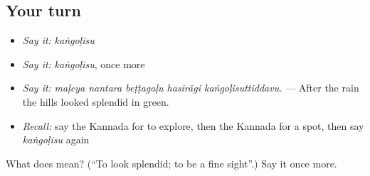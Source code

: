 \subsection*{Your turn}
\begin{itemize}
\raggedright
  \item \emph{Say it:} \emph{kaṅgoḷisu}
  \item \emph{Say it:} \emph{kaṅgoḷisu}, once more
  \item \emph{Say it:} \emph{maḷeya nantara beṭṭagaḷu hasirāgi kaṅgoḷisuttiddavu.} — After the rain the hills looked splendid in green.
  \item \emph{Recall:} say the Kannada for to explore, then the Kannada for a spot, then say \emph{kaṅgoḷisu} again
\end{itemize}

\begin{tcolorbox}[breakable,colback=teal!4,colframe=teal!35!black,title={Before you move on}]
What does  mean? (\textquotedblleft{}To look splendid; to be a fine sight\textquotedblright{}.) Say it once more.
\end{tcolorbox}
